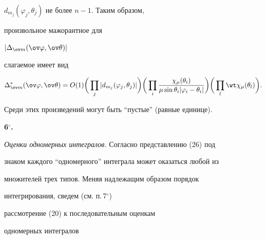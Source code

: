 $d_{m_j}(\varphi_j,\theta_j)$ не более $n-1$. Таким образом, 


произвольное мажорантное для 


$|\Delta_{\ov m}(\ov\varphi,\ov\theta)|$ 


слагаемое имеет вид 


\begin{equation} 


\Delta^*_{\ov m}(\ov\varphi,\ov\theta)=O(1)\bigg( 


\prod_j |d_{m_j}(\varphi_j,\theta_j)|\bigg) 


\bigg(\prod_i 


\frac{\chi_\mu(\theta_i)} 


{\mu\sin\theta_i|\varphi_i-\theta_i|}\bigg) 


\bigg(\prod_l\wt\chi_\mu(\theta_l)\bigg). 


\end{equation} 


Среди этих произведений могут быть ``пустые'' (равные единице). 


\medskip 


 


{\bf 6${}^\circ$.} 


{\it Оценки одномерных интегралов.} Согласно представлению (26) под 


знаком каждого ``одномерного'' интеграла может оказаться любой из 


множителей трех типов. Меняя  надлежащим образом порядок 


интегрирования, сведем (см. п.\,7${}^\circ$) 


рассмотрение (20) к последовательным оценкам 


одномерных интегралов 


